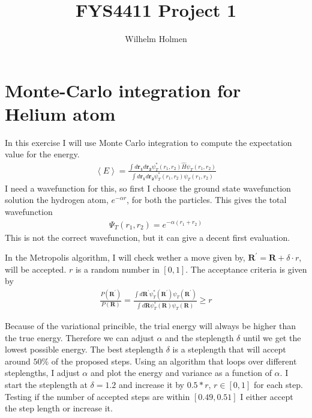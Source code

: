 \documentclass[a4paper, 12pt, titlepage]{article}
\author{Wilhelm Holmen}
\title{FYS4411 Project 1}
\begin{document}
 \maketitle
 \newpage

 \section*{Monte-Carlo integration for Helium atom}
 In this exercise I will use Monte Carlo integration to compute the expectation value for the energy. 
 \begin{align*}
 	\left< E \right> = \frac{\int d \mathbf{r_1} d \mathbf{r_2} \psi_T^*(r_1,r_2) \hat H \psi_T(r_1,r_2)}{\int d \mathbf{r_1} d \mathbf{r_2} \psi_T^*(r_1,r_2) \psi_T(r_1,r_2)}
 \end{align*}
 I need a wavefunction for this, so first I choose the ground state wavefunction solution the hydrogen atom, $e^{-\alpha r}$, for both the particles. This gives the total wavefunction
 \begin{align*}
 	\Psi_T(r_1,r_2) = e^{-\alpha(r_1 + r_2)}
 \end{align*}
 This is not the correct wavefunction, but it can give a decent first evaluation. 

 In the Metropolis algorithm, I will check wether a move given by, $\mathbf{R^{'}} = \mathbf{R} + \delta \cdot r $, will be accepted. $r$ is a random number in $[0,1]$. The acceptance criteria is given by
 \begin{align*}
 	\frac{P(\mathbf{R^{'}} )}{P(\mathbf{R} )} = \frac{\int d \mathbf{R^{'}} \psi^*_T(\mathbf{R^{'}} ) \psi_T(\mathbf{R^{'}} )}{\int d \mathbf{R} \psi^*_T(\mathbf{R}) \psi_T(\mathbf{R} )} \geq r
 \end{align*}

 Because of the variational princible, the trial energy will always be higher than the true energy. Therefore we can adjust $\alpha$ and the steplength $\delta$ until we get the lowest possible energy. The best steplength $\delta$ is a steplength that will accept around $50\%$ of the proposed steps. Using an algorithm that loops over different steplengths, I adjust $\alpha$ and plot the energy and variance as a function of $\alpha$. I start the steplength at $\delta = 1.2$ and increase it by $0.5*r$, $r \in [0,1]$ for each step. Testing if the number of accepted steps are within $[0.49,0.51]$ I either accept the step length or increase it.  
\end{document}
